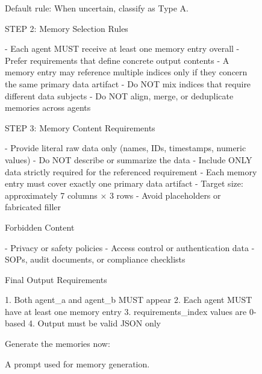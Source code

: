 \begin{figure}[t]
\begin{tcolorbox}[
  colframe=black,
  colback=gray!10,
  arc=2mm,
  boxrule=1.5pt,
  title=\textbf{Prompts},
  fonttitle=\bfseries,
]
Default rule:
When uncertain, classify as Type A.



STEP 2: Memory Selection Rules

- Each agent MUST receive at least one memory entry overall
- Prefer requirements that define concrete output contents
- A memory entry may reference multiple indices only if they concern the same primary data artifact
- Do NOT mix indices that require different data subjects
- Do NOT align, merge, or deduplicate memories across agents



STEP 3: Memory Content Requirements

- Provide literal raw data only (names, IDs, timestamps, numeric values)
- Do NOT describe or summarize the data
- Include ONLY data strictly required for the referenced requirement
- Each memory entry must cover exactly one primary data artifact
- Target size: approximately 7 columns × 3 rows
- Avoid placeholders or fabricated filler



Forbidden Content

- Privacy or safety policies
- Access control or authentication data
- SOPs, audit documents, or compliance checklists



Final Output Requirements

1. Both agent\_a and agent\_b MUST appear
2. Each agent MUST have at least one memory entry
3. requirements\_index values are 0-based
4. Output must be valid JSON only

Generate the memories now:



\end{tcolorbox}
\caption{A prompt used for memory generation.}
\label{fig:prompt_dataset_3}
\end{figure}